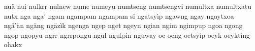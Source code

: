 \documentclass[a4paper]{article}
\begin{document}
nuä\hspace{2mm}
nui\hspace{2mm}
nulkrr\hspace{2mm}
nulnew\hspace{2mm}
nume\hspace{2mm}
numeyu\hspace{2mm}
numtseng\hspace{2mm}
numtsengvi\hspace{2mm}
numultxa\hspace{2mm}
numultxatu\hspace{2mm}
nutx\hspace{2mm}
nga\hspace{2mm}
nga'\hspace{2mm}
ngam\hspace{2mm}
ngampam\hspace{2mm}
ngampam si\hspace{2mm}
ngatsyìp\hspace{2mm}
ngawng\hspace{2mm}
ngay\hspace{2mm}
ngaytxoa\hspace{2mm}
ngä'än\hspace{2mm}
ngäng\hspace{2mm}
ngäzìk\hspace{2mm}
ngenga\hspace{2mm}
ngep\hspace{2mm}
nget\hspace{2mm}
ngeyn\hspace{2mm}
ngian\hspace{2mm}
ngim\hspace{2mm}
ngimpup\hspace{2mm}
ngoa\hspace{2mm}
ngong\hspace{2mm}
ngop\hspace{2mm}
ngopyu\hspace{2mm}
ngrr\hspace{2mm}
ngrrpongu\hspace{2mm}
ngul\hspace{2mm}
ngulpin\hspace{2mm}
nguway\hspace{2mm}
oe\hspace{2mm}
oeng\hspace{2mm}
oetsyìp\hspace{2mm}
oeyk\hspace{2mm}
oeyktìng\hspace{2mm}
ohakx\hspace{2mm}
\end{document}
